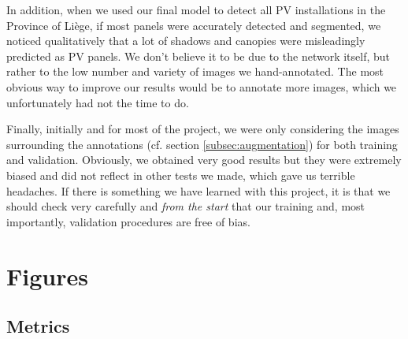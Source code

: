 \documentclass[twocolumn,superscriptaddress,aps,nofootinbib]{revtex4-1}
\begin{document}
In addition, when we used our final model to detect all PV installations in the Province of Liège, if most panels were accurately detected and segmented, we noticed qualitatively that a lot of shadows and canopies were misleadingly predicted as PV panels. We don't believe it to be due to the network itself, but rather to the low number and variety of images we hand-annotated. The most obvious way to improve our results would be to annotate more images, which we unfortunately had not the time to do.

Finally, initially and for most of the project, we were only considering the images surrounding the annotations (cf. section \ref{subsec:augmentation}) for both training and validation. Obviously, we obtained very good results but they were extremely biased and did not reflect in other tests we made, which gave us terrible headaches. If there is something we have learned with this project, it is that we should check very carefully and \emph{from the start} that our training and, most importantly, validation procedures are free of bias.





\clearpage

\appendix

\section{Figures} \label{app:figures}

\subsection{Metrics} \label{subapp:metrics}
\end{document}
